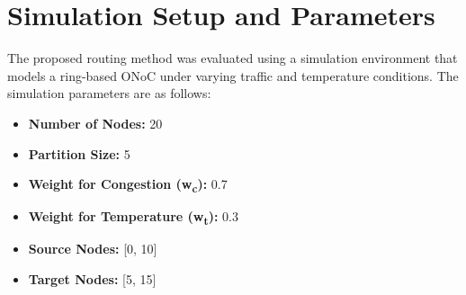 \documentclass[conference]{IEEEtran}
\begin{document}
\section{Simulation Setup and Parameters}
The proposed routing method was evaluated using a simulation environment that models a ring-based ONoC under varying traffic and temperature conditions. The simulation parameters are as follows:
\begin{itemize}
    \item \textbf{Number of Nodes:} 20
    \item \textbf{Partition Size:} 5
    \item \textbf{Weight for Congestion (w\textsubscript{c}):} 0.7
    \item \textbf{Weight for Temperature (w\textsubscript{t}):} 0.3
    \item \textbf{Source Nodes:} [0, 10]
    \item \textbf{Target Nodes:} [5, 15]
\end{itemize}
\end{document}
